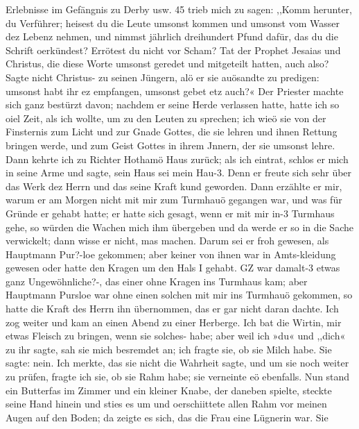 Erlebnisse im Gefängnis zu Derby usw. 45
trieb mich zu sagen: ,,Komm herunter, du Verführer; heisest du
die Leute umsonst kommen und umsonst vom Wasser dez Lebenz
nehmen, und nimmst jährlich dreihundert Pfund dafür, das du die
Schrift oerkündest? Errötest du nicht vor Scham? Tat der
Prophet Jesaias und Christus, die diese Worte umsonst geredet
und mitgeteilt hatten, auch also? Sagte nicht Christus- zu seinen
Jüngern, alö er sie auösandte zu predigen: umsonst habt ihr ez
empfangen, umsonst gebet etz auch?« Der Priester machte sich
ganz bestürzt davon; nachdem er seine Herde verlassen hatte,
hatte ich so oiel Zeit, als ich wollte, um zu den Leuten zu sprechen;
ich wieö sie von der Finsternis zum Licht und zur Gnade Gottes,
die sie lehren und ihnen Rettung bringen werde, und zum Geist
Gottes in ihrem Jnnern, der sie umsonst lehre.
Dann kehrte ich zu Richter Hothamö Haus zurück; als ich
eintrat, schlos er mich in seine Arme und sagte, sein Haus sei
mein Hau-3. Denn er freute sich sehr über das Werk dez Herrn
und das seine Kraft kund geworden. Dann erzählte er mir,
warum er am Morgen nicht mit mir zum Turmhauö gegangen
war, und was für Gründe er gehabt hatte; er hatte sich gesagt,
wenn er mit mir in-3 Turmhaus gehe, so würden die Wachen
mich ihm übergeben und da werde er so in die Sache verwickelt;
dann wisse er nicht, mas machen. Darum sei er froh gewesen,
als Hauptmann Pur?-loe gekommen; aber keiner von ihnen war
in Amts-kleidung gewesen oder hatte den Kragen um den Hals I
gehabt. GZ war damalt-3 etwas ganz Ungewöhnliche?-, das einer
ohne Kragen ins Turmhaus kam; aber Hauptmann Pursloe
war ohne einen solchen mit mir ins Turmhauö gekommen, so hatte
die Kraft des Herrn ihn übernommen, das er gar nicht daran
dachte.
Ich zog weiter und kam an einen Abend zu einer Herberge.
Ich bat die Wirtin, mir etwas Fleisch zu bringen, wenn sie solches-
habe; aber weil ich »du« und ,,dich« zu ihr sagte, sah sie mich
besremdet an; ich fragte sie, ob sie Milch habe. Sie sagte: nein.
Ich merkte, das sie nicht die Wahrheit sagte, und um sie noch
weiter zu prüfen, fragte ich sie, ob sie Rahm habe; sie verneinte eö
ebenfalls. Nun stand ein Butterfas im Zimmer und ein kleiner
Knabe, der daneben spielte, steckte seine Hand hinein und sties es
um und oerschiittete allen Rahm vor meinen Augen auf den
Boden; da zeigte es sich, das die Frau eine Lügnerin war. Sie


